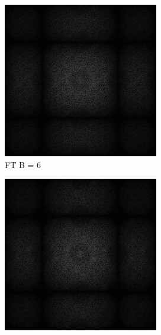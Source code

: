 \begin{figure}[H]

    \centering
    \begin{subfigure}[b]{0.2\linewidth}
      \includegraphics[width=\linewidth]{content/TemporalerAlg/Bilder/Sorting/DiffDimensions/6/seed_debug_5.0_small.png}
       \caption{FT B = 6}
       \label{pic:fftB_6}
    \end{subfigure}
    \begin{subfigure}[b]{0.2\linewidth}
      \includegraphics[width=\linewidth]{content/TemporalerAlg/Bilder/Sorting/DiffDimensions/7/seed_debug_5.0_small.png}

\end{subfigure}
\end{figure}
